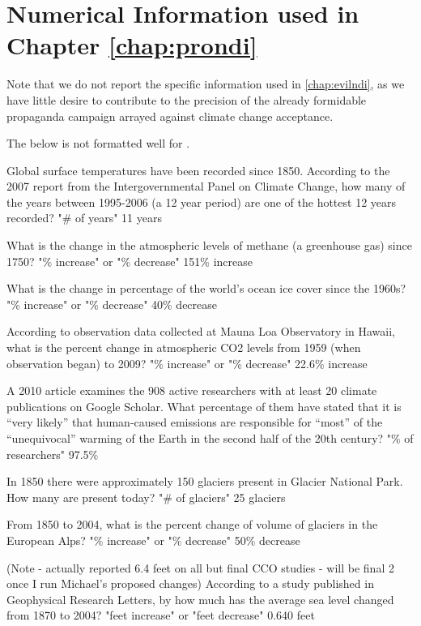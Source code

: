 \chapter{Numerical Information used in Chapter \ref{chap:prondi}}
\label{app:numbers}

Note that we do not report the specific information used in \ref{chap:evilndi},
as we have little desire to contribute to the precision of the already
formidable propaganda campaign arrayed against climate change acceptance.

The below is not formatted well for .


Global surface temperatures have been recorded since 1850. According to the 2007 report from the Intergovernmental Panel on Climate Change, how many of the years between 1995-2006 (a 12 year period) are one of the hottest 12 years recorded?
"\# of years"
11 years

What is the change in the atmospheric levels of methane (a greenhouse gas) since 1750?
"\% increase" or "\% decrease"
151\% increase

What is the change in percentage of the world's ocean ice cover since the 1960s?
"\% increase" or "\% decrease"
40\% decrease

According to observation data collected at Mauna Loa Observatory in Hawaii, what is the percent change in atmospheric CO2 levels from 1959 (when observation began) to 2009?
"\% increase" or "\% decrease"
22.6\% increase

A 2010 article examines the 908 active researchers with at least 20 climate publications on Google Scholar. What percentage of them have stated that it is “very likely” that human-caused emissions are responsible for “most” of the “unequivocal” warming of the Earth in the second half of the 20th century?
"\% of researchers"
97.5\%

In 1850 there were approximately 150 glaciers present in Glacier National Park. How many are present today?
"\# of glaciers"
25 glaciers

From 1850 to 2004, what is the percent change of volume of glaciers in the European Alps?
"\% increase" or "\% decrease"
50\% decrease

(Note - actually reported 6.4 feet on all but final CCO studies - will be final
2 once I run Michael's proposed changes)
According to a study published in Geophysical Research Letters, by how much has the average sea level changed from 1870 to 2004?
"feet increase" or "feet decrease"
0.640 feet

